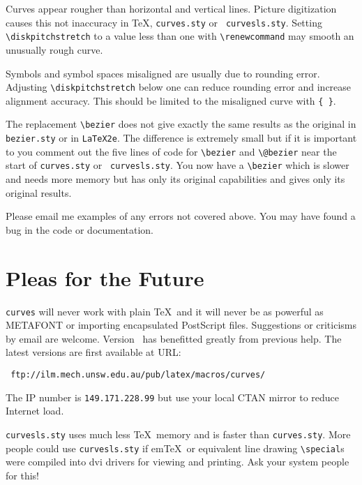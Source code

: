   Curves appear rougher than horizontal and vertical lines. Picture
digitization causes this not inaccuracy in \TeX, {\tt curves.sty} or {\tt
curvesls.sty}. Setting \verb?\diskpitchstretch? to a value less than one with
\verb?\renewcommand? may smooth an unusually rough curve.

  Symbols and symbol spaces misaligned are usually due to rounding error.
Adjusting \verb?\diskpitchstretch? below one can reduce rounding error and
increase alignment accuracy. This should be limited to the misaligned curve
with {\tt \{\ \}}\footnotemark[1].

  The replacement \verb?\bezier? does not give exactly the same results as the 
original in {\tt bezier.sty} or in {\tt LaTeX2e}. The difference is extremely 
small but if it is important to you comment out the five lines of code for 
\verb?\bezier? and \verb?\@bezier? near the start of {\tt curves.sty} or {\tt 
curvesls.sty}. You now have a \verb?\bezier? which is slower and needs more 
memory but has only its original capabilities and gives only its original 
results. 
    
Please email me examples of any errors not covered above. You may have found a 
bug in the code or documentation. 
  
\section{Pleas for the Future}

{\tt curves} will never work with plain \TeX\ and it will never be as
powerful as {\sf METAFONT} or importing encapsulated PostScript
files. Suggestions or criticisms by email are 
welcome. Version \version\ has benefitted greatly from previous
help. The latest versions are first available at URL:
 \begin{verbatim}
 ftp://ilm.mech.unsw.edu.au/pub/latex/macros/curves/
 \end{verbatim}
 The IP number is {\tt 149.171.228.99} but use your local CTAN mirror to
reduce Internet load.

{\tt curvesls.sty} uses much less \TeX\ memory and is faster than
{\tt curves.sty}. More people could use {\tt curvesls.sty} if em\TeX\
or equivalent line drawing \verb?\special?s were compiled into dvi
drivers for viewing and printing. Ask your system people for this!

